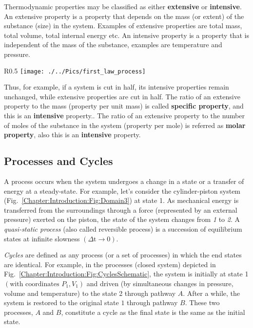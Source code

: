    Thermodynamic properties may be classified as either {\bf extensive} or {\bf intensive}. An extensive property is a property that depends on the mass (or extent) of the substance (\ie size) in the system. Examples of extensive properties are total mass, total volume, total internal energy etc. An intensive property is a property that is independent of the mass of the substance, examples are temperature and pressure.
   \begin{wrapfigure}{R}{0.5\columnwidth}
        \texttt{[image: ./../Pics/first\_law\_process]}
        \caption{Schematic representation of cycles.}\label{Chapter:Introduction:Fig:CyclesSchematic}
   \end{wrapfigure}

   Thus, for example, if a system is cut in half, its intensive properties remain unchanged, while extensive properties are cut in half. The ratio of an extensive property to the mass (\ie property per unit mass) is called {\bf specific property}, and this is an {\bf intensive} property.. The ratio of an extensive property to the number of moles of the substance in the system (\ie property per mole) is referred as {\bf molar property}, also this is an {\bf intensive} property.

   \subsection{Processes and Cycles}\label{Chapter:Introduction:Section:Introduction:ProcessesCyclesDefinition}
   A process occurs when the system undergoes a change in a state or a transfer of energy at a steady-state. For example, let's consider the cylinder-piston system (Fig.~\ref{Chapter:Introduction:Fig:Domain3}) at state 1. As mechanical energy is transferred from the surroundings through a force (represented by an external pressure) exerted on the piston, the state of the system changes from {\it 1} to {\it 2}. A {\it quasi-static process} (also called reversible process) is a succession of equilibrium states at infinite slowness $\left(\Delta\text{t}\rightarrow\text{0}\right)$.
   
   {\it Cycles} are defined as any process (or a set of processes) in which the end states are identical. For example, in the processes (closed system) depicted in Fig.~\ref{Chapter:Introduction:Fig:CyclesSchematic}, the system is initially at state 1 $\left(\text{with coordinates } P_{1},V_{1}\right)$ and driven (by simultaneous changes in pressure, volume and temperature) to the state 2 through pathway $A$. After a while, the system is restored to the original state $1$ through pathway $B$. These two processes, $A$ and $B$, constitute a cycle as the final state is the same as the initial state.   
   
